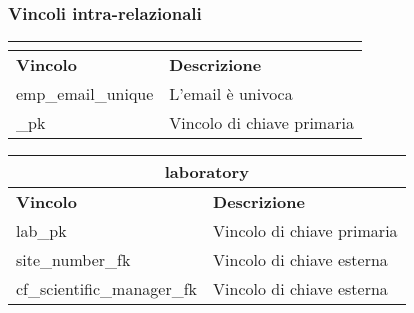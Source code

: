 \subsubsection{Vincoli intra-relazionali}
\begin{tabular}{@{}| p{} | p{} |@{}} %
	\hline
	\multicolumn{2}{|c|}{\textbf{\baseemp}}         \\
	\hline
	\textbf{Vincolo}   & \textbf{Descrizione}       \\
	\hline
	emp\_email\_unique & L'email è univoca          \\
	\hline

	\baseemp\_pk       & Vincolo di chiave primaria \\
	\hline
\end{tabular}\bskip
\begin{tabular}{@{}| p{} | p{} |@{}} %
	\hline
	\multicolumn{2}{|c|}{\textbf{laboratory}}                \\
	\hline
	\textbf{Vincolo}            & \textbf{Descrizione}       \\
	\hline
	lab\_pk                     & Vincolo di chiave primaria \\
	\hline
	site\_number\_fk            & Vincolo di chiave esterna  \\
	\hline
	cf\_scientific\_manager\_fk & Vincolo di chiave esterna  \\
	\hline
\end{tabular}\bskip
